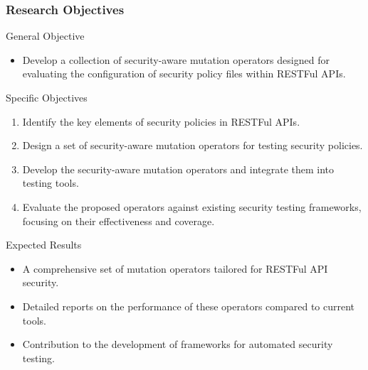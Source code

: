 \documentclass[12pt]{beamer}
\theoremstyle{remark}
\theoremstyle{definition}
\begin{document}
\begin{frame}[allowframebreaks]
\frametitle{Research Objectives}
\begin{block}{General Objective}
\begin{itemize}
    \item Develop a collection of security-aware mutation operators designed for evaluating the configuration of security policy files within RESTFul APIs.
\end{itemize}
\end{block}

\begin{block}{Specific Objectives}
\begin{enumerate}
    \item Identify the key elements of security policies in RESTFul APIs.
    \item Design a set of security-aware mutation operators for testing security policies.
    \item Develop the security-aware mutation operators and integrate them into testing tools.
    \item Evaluate the proposed operators against existing security testing frameworks, focusing on their effectiveness and coverage.
\end{enumerate}
\end{block}

\begin{block}{Expected Results}
\begin{itemize}
    \item A comprehensive set of mutation operators tailored for RESTFul API security.
    \item Detailed reports on the performance of these operators compared to current tools.
    \item Contribution to the development of frameworks for automated security testing.
\end{itemize}
\end{block}
\end{frame}
\end{document}
